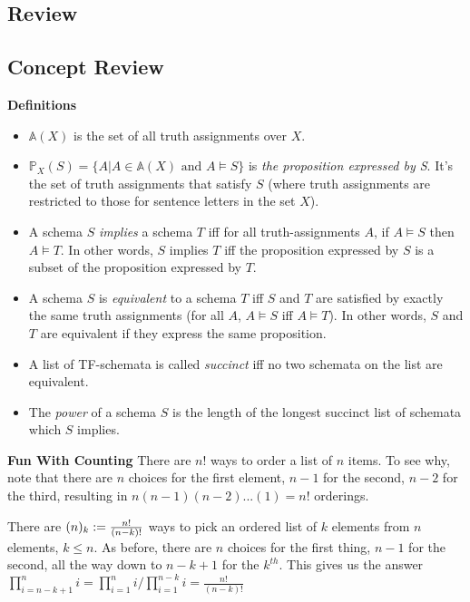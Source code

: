 \subsection{Review}
\begin{mdframed}[linewidth=1]
\section*{Concept Review}
\textbf{Definitions}
\begin{itemize}
    \item $\mathbb{A}(X)$ is the set of all truth assignments over $X$. 
    
    \item $\mathbb{P}_X(S) = \{A | A \in \mathbb{A}(X) \text{ and } A \models S\}$ is \emph{the proposition expressed by S}. It's the set of truth assignments that satisfy $S$ (where truth assignments are restricted to those for sentence letters in the set $X$). 
    
    \item A schema $S$ \emph{implies} a schema $T$ iff for all truth-assignments $A$, if $A \models S$ then $A \models T$. In other words, $S$ implies $T$ iff the proposition expressed by $S$ is a subset of the proposition expressed by $T$. 
    
    \item A schema $S$ is \emph{equivalent} to a schema $T$ iff $S$ and $T$ are satisfied by exactly the same truth assignments (for all $A$, $A \models S$ iff $A \models T$). In other words, $S$ and $T$ are equivalent if they express the same proposition. 

    \item A list of TF-schemata is called \emph{succinct} iff no two schemata on the list are equivalent. 
    
    \item The \emph{power} of a schema $S$ is the length of the longest succinct list of schemata which $S$ implies. %
\end{itemize}

\textbf{Fun With Counting}
There are $n!$ ways to order a list of $n$ items. To see why, note that there are $n$ choices for the first element, $n - 1$ for the second, $n - 2$ for the third, resulting in $n(n - 1)(n - 2)...(1) = n!$ orderings. 

There are $\mbox{$(n)_{k}$} := \frac{n!}{(n-k)!}$ ways to pick an ordered list of $k$ elements from $n$ elements, $k \leq n$. As before, there are $n$ choices for the first thing, $n-1$ for the second, all the way down to $n-k+1$ for the $k^{th}$. This gives us the answer $\prod_{i = n - k + 1}^ni = \prod_{i = 1}^ni / \prod_{i = 1}^{n - k}i = \frac{n!}{(n-k)!}$   


\end{mdframed}
